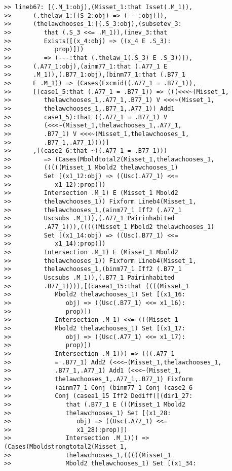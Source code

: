 \documentclass[12pt]{article}
\begin{document}
\begin{verbatim}
>> lineb67: [(.M_1:obj),(Misset_1:that Isset(.M_1)),
>>      (.thelaw_1:[(S_2:obj) => (---:obj)]),
>>      (thelawchooses_1:[(.S_3:obj),(subsetev_3:
>>         that (.S_3 <<= .M_1)),(inev_3:that
>>         Exists([(x_4:obj) => ((x_4 E .S_3):
>>            prop)]))
>>         => (---:that (.thelaw_1(.S_3) E .S_3))]),
>>      (.A77_1:obj),(ainm77_1:that (.A77_1 E
>>      .M_1)),(.B77_1:obj),(binm77_1:that (.B77_1
>>      E .M_1)) => (Cases(Excmid((.A77_1 = .B77_1)),
>>      [(case1_5:that (.A77_1 = .B77_1)) => (((<<<~(Misset_1,
>>         thelawchooses_1,.A77_1,.B77_1) V <<<~(Misset_1,
>>         thelawchooses_1,.B77_1,.A77_1)) Add1
>>         case1_5):that ((.A77_1 = .B77_1) V
>>         (<<<~(Misset_1,thelawchooses_1,.A77_1,
>>         .B77_1) V <<<~(Misset_1,thelawchooses_1,
>>         .B77_1,.A77_1))))]
>>      ,[(case2_6:that ~((.A77_1 = .B77_1)))
>>         => (Cases(Mboldtotal2(Misset_1,thelawchooses_1,
>>         (((((Misset_1 Mbold2 thelawchooses_1)
>>         Set [(x1_12:obj) => ((Usc(.A77_1) <<=
>>            x1_12):prop)])
>>         Intersection .M_1) E (Misset_1 Mbold2
>>         thelawchooses_1)) Fixform Lineb4(Misset_1,
>>         thelawchooses_1,(ainm77_1 Iff2 (.A77_1
>>         Uscsubs .M_1)),(.A77_1 Pairinhabited
>>         .A77_1))),(((((Misset_1 Mbold2 thelawchooses_1)
>>         Set [(x1_14:obj) => ((Usc(.B77_1) <<=
>>            x1_14):prop)])
>>         Intersection .M_1) E (Misset_1 Mbold2
>>         thelawchooses_1)) Fixform Lineb4(Misset_1,
>>         thelawchooses_1,(binm77_1 Iff2 (.B77_1
>>         Uscsubs .M_1)),(.B77_1 Pairinhabited
>>         .B77_1)))),[(casea1_15:that ((((Misset_1
>>            Mbold2 thelawchooses_1) Set [(x1_16:
>>               obj) => ((Usc(.B77_1) <<= x1_16):
>>               prop)])
>>            Intersection .M_1) <<= (((Misset_1
>>            Mbold2 thelawchooses_1) Set [(x1_17:
>>               obj) => ((Usc(.A77_1) <<= x1_17):
>>               prop)])
>>            Intersection .M_1))) => (((.A77_1
>>            = .B77_1) Add2 (<<<~(Misset_1,thelawchooses_1,
>>            .B77_1,.A77_1) Add1 (<<<~(Misset_1,
>>            thelawchooses_1,.A77_1,.B77_1) Fixform
>>            (ainm77_1 Conj (binm77_1 Conj (case2_6
>>            Conj (casea1_15 Iff2 Dediff([(dir1_27:
>>               that (.B77_1 E (((Misset_1 Mbold2
>>               thelawchooses_1) Set [(x1_28:
>>                  obj) => ((Usc(.A77_1) <<=
>>                  x1_28):prop)])
>>               Intersection .M_1))) => (Cases(Mboldstrongtotal2(Misset_1,
>>               thelawchooses_1,(((((Misset_1
>>               Mbold2 thelawchooses_1) Set [(x1_34:

\end{verbatim}
\end{document}
